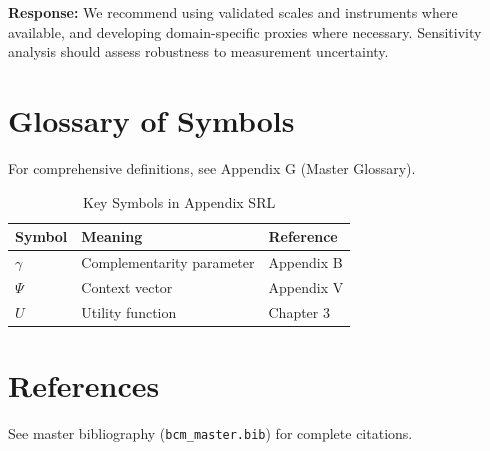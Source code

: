 \textbf{Response:} We recommend using validated scales and instruments where
available, and developing domain-specific proxies where necessary. Sensitivity
analysis should assess robustness to measurement uncertainty.



\section{Glossary of Symbols}
\label{sec:srl-glossary}

For comprehensive definitions, see Appendix G (Master Glossary).

\begin{table}[htbp]
\centering
\caption{Key Symbols in Appendix SRL}
\begin{tabular}{lll}
\toprule
\textbf{Symbol} & \textbf{Meaning} & \textbf{Reference} \\
\midrule
$\gamma$ & Complementarity parameter & Appendix B \\
$\Psi$ & Context vector & Appendix V \\
$U$ & Utility function & Chapter 3 \\
\bottomrule
\end{tabular}
\end{table}


\section{References}
\label{sec:srl-references}

See master bibliography (\texttt{bcm\_master.bib}) for complete citations.

\nocite{bcm_master}

